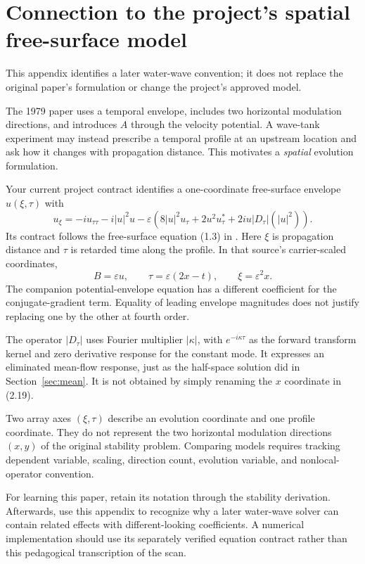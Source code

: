 \section{Connection to the project's spatial free-surface model}
\label{sec:project}
This appendix identifies a later water-wave convention; it does not replace
the original paper's formulation or change the project's approved model.

The 1979 paper uses a temporal envelope, includes two horizontal modulation
directions, and introduces $A$ through the velocity potential. A wave-tank
experiment may instead prescribe a temporal profile at an upstream location
and ask how it changes with propagation distance. This motivates a
\emph{spatial} evolution formulation.

Your current project contract identifies a one-coordinate free-surface
envelope $u(\xi,\tau)$ with
\begin{equation}\label{eq:spatial-model}
 u_\xi=-iu_{\tau\tau}-i|u|^2u
 -\varepsilon\left(8|u|^2u_\tau+2u^2u_\tau^*
                  +2iu|D_\tau|(|u|^2)\right).
\end{equation}
Its contract follows the free-surface equation (1.3) in \cite{fedele}.
Here $\xi$ is propagation distance and $\tau$ is retarded time along the
profile. In that source's carrier-scaled coordinates,
\[
 B=\varepsilon u,\qquad
 \tau=\varepsilon(2x-t),\qquad \xi=\varepsilon^2x.
\]
The companion potential-envelope equation has a different coefficient for
the conjugate-gradient term. Equality of leading envelope magnitudes does
not justify replacing one by the other at fourth order.

The operator $|D_\tau|$ uses Fourier multiplier $|\kappa|$, with
$e^{-i\kappa\tau}$ as the forward transform kernel and zero derivative
response for the constant mode. It expresses an eliminated mean-flow
response, just as the half-space solution did in Section~\ref{sec:mean}.
It is not obtained by simply renaming the $x$ coordinate in (2.19).

Two array axes $(\xi,\tau)$ describe an evolution coordinate and one
profile coordinate. They do not represent the two horizontal modulation
directions $(x,y)$ of the original stability problem. Comparing models
requires tracking dependent variable, scaling, direction count,
evolution variable, and nonlocal-operator convention.

For learning this paper, retain its notation through the stability
derivation. Afterwards, use this appendix to recognize why a later
water-wave solver can contain related effects with different-looking
coefficients. A numerical implementation should use its separately verified
equation contract rather than this pedagogical transcription of the scan.
\clearpage
